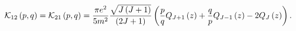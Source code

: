 \begin{equation}
\mathcal{K}_{12}\left( p,q\right) =\mathcal{K}_{21}\left( p,q\right) =\frac{%
\pi e^{2}}{5m^{2}}\frac{\sqrt{J\left( J+1\right) }}{\left( 2J+1\right) }%
\left( \frac{p}{q}Q_{J+1}\left( z\right) +\frac{q}{p}Q_{J-1}\left( z\right)
-2Q_{J}\left( z\right) \right) .
\end{equation}

